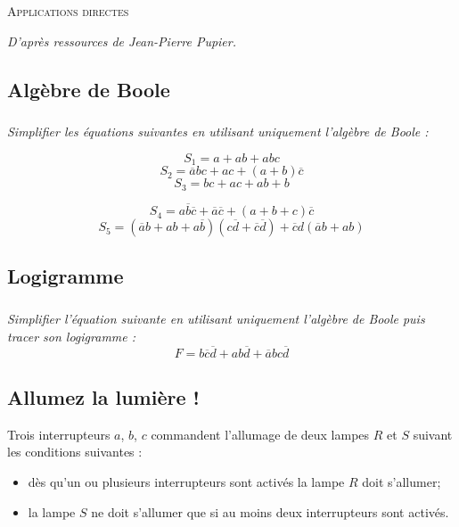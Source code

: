 \documentclass[10pt]{article}
\begin{document}

\begin{center}
\large{\textsc{Applications directes}}
\end{center}

\vspace{.5cm}
\begin{flushright}
\textit{D'après ressources de Jean-Pierre Pupier.}
\end{flushright}

\subsection*{Algèbre de Boole}
\setcounter{subparagraph}{0}
\subparagraph{}
\textit{Simplifier les équations suivantes en utilisant uniquement l'algèbre de Boole :}

\begin{minipage}[c]{.47\linewidth}
$$S_1 = a+ab+abc$$
$$S_2 = \overline{a}bc+ac+(a+b)\overline{c}$$
$$S_3 = bc + ac + ab + b$$
\end{minipage}\hfill
\begin{minipage}[c]{.47\linewidth}
$$S_4 = a\overline{b}\overline{c}+\overline{a}\overline{c}+(a+b+c)\overline{c}$$
$$S_5 = (\overline{a}b+ab+a\overline{b})(c\overline{d}+\overline{c}\overline{d})+\overline{c}d(\overline{a}b+ab)$$
\end{minipage}


\subsection*{Logigramme}
\setcounter{subparagraph}{0}
\subparagraph{}
\textit{Simplifier l'équation suivante en utilisant uniquement l'algèbre de Boole puis tracer son logigramme :}
$$
F = b\overline{c}\overline{d}+ab\overline{d}+\overline{a}bc\overline{d}
$$

\subsection*{Allumez la lumière !}
\setcounter{subparagraph}{0}

Trois interrupteurs $a$, $b$, $c$ commandent l’allumage de deux lampes $R$ et $S$ suivant les conditions suivantes :
\begin{itemize}
\item dès qu’un ou plusieurs interrupteurs sont activés la lampe $R$ doit s’allumer;
\item la lampe $S$ ne doit s’allumer que si au moins deux interrupteurs sont activés.
\end{itemize}
\end{document}
